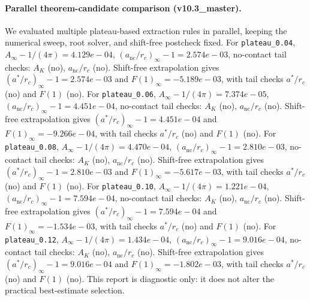 \paragraph{Parallel theorem-candidate comparison (v10.3_master).}
We evaluated multiple plateau-based extraction rules in parallel, keeping the numerical sweep, root solver, and shift-free postcheck fixed. For \texttt{plateau_0.04}, $A_\infty-1/(4\pi)=4.129e-04$, $(a_{\mathrm{nc}}/r_c)_\infty-1=2.574e-03$, no-contact tail checks: $A_K$ (no), $a_{\mathrm{nc}}/r_c$ (no). Shift-free extrapolation gives $(a^*/r_c)_\infty-1=2.574e-03$ and $F(1)_\infty=-5.189e-03$, with tail checks $a^*/r_c$ (no) and $F(1)$ (no). For \texttt{plateau_0.06}, $A_\infty-1/(4\pi)=7.374e-05$, $(a_{\mathrm{nc}}/r_c)_\infty-1=4.451e-04$, no-contact tail checks: $A_K$ (no), $a_{\mathrm{nc}}/r_c$ (no). Shift-free extrapolation gives $(a^*/r_c)_\infty-1=4.451e-04$ and $F(1)_\infty=-9.266e-04$, with tail checks $a^*/r_c$ (no) and $F(1)$ (no). For \texttt{plateau_0.08}, $A_\infty-1/(4\pi)=4.470e-04$, $(a_{\mathrm{nc}}/r_c)_\infty-1=2.810e-03$, no-contact tail checks: $A_K$ (no), $a_{\mathrm{nc}}/r_c$ (no). Shift-free extrapolation gives $(a^*/r_c)_\infty-1=2.810e-03$ and $F(1)_\infty=-5.617e-03$, with tail checks $a^*/r_c$ (no) and $F(1)$ (no). For \texttt{plateau_0.10}, $A_\infty-1/(4\pi)=1.221e-04$, $(a_{\mathrm{nc}}/r_c)_\infty-1=7.594e-04$, no-contact tail checks: $A_K$ (no), $a_{\mathrm{nc}}/r_c$ (no). Shift-free extrapolation gives $(a^*/r_c)_\infty-1=7.594e-04$ and $F(1)_\infty=-1.534e-03$, with tail checks $a^*/r_c$ (no) and $F(1)$ (no). For \texttt{plateau_0.12}, $A_\infty-1/(4\pi)=1.434e-04$, $(a_{\mathrm{nc}}/r_c)_\infty-1=9.016e-04$, no-contact tail checks: $A_K$ (no), $a_{\mathrm{nc}}/r_c$ (no). Shift-free extrapolation gives $(a^*/r_c)_\infty-1=9.016e-04$ and $F(1)_\infty=-1.802e-03$, with tail checks $a^*/r_c$ (no) and $F(1)$ (no). This report is diagnostic only: it does not alter the practical best-estimate selection.
